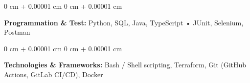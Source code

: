 \documentclass[10pt, letterpaper]{article}
\newenvironment{onecolentry}{
    \begin{adjustwidth}{
        0 cm + 0.00001 cm
    }{
        0 cm + 0.00001 cm
    }
}{
    \end{adjustwidth}
} %
\begin{document}
        
        \begin{onecolentry}
            \textbf{Programmation \& Test:} Python, SQL, Java, TypeScript • JUnit, Selenium, Postman
        \end{onecolentry}

        \vspace{0.2 cm}

        \begin{onecolentry}
            \textbf{Technologies \& Frameworks:} Bash / Shell scripting, Terraform, Git (GitHub Actions, GitLab CI/CD), Docker
        \end{onecolentry}


    
\end{document}
